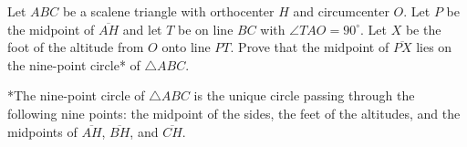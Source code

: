 Let $ABC$ be a scalene triangle with orthocenter $H$ and circumcenter $O$. Let $P$ be the midpoint of $\overline{AH}$ and let $T$ be on line $BC$ with $\angle TAO=90^{\circ}$. Let $X$ be the foot of the altitude from $O$ onto line $PT$. Prove that the midpoint of $\overline{PX}$ lies on the nine-point circle* of $\triangle ABC$.

*The nine-point circle of $\triangle ABC$ is the unique circle passing through the following nine points: the midpoint of the sides, the feet of the altitudes, and the midpoints of $\overline{AH}$, $\overline{BH}$, and $\overline{CH}$.

